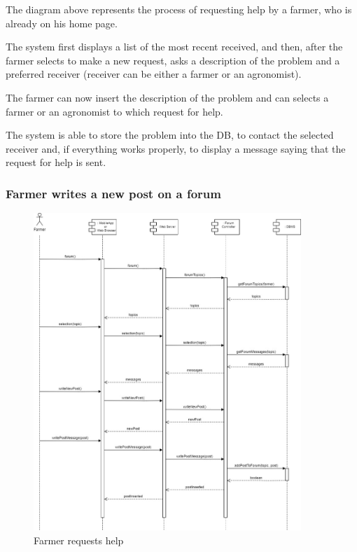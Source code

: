 \documentclass{article}
\begin{document}
        The diagram above represents the process of requesting help by a farmer, who is already on his home page. \par
        The system first displays a list of the most recent received, and then, after the farmer selects to make a new request, asks a description of the problem and a preferred receiver (receiver can be either a farmer or an agronomist). \par
        The farmer can now insert the description of the problem and can selects a farmer or an agronomist to which request for help. \par
        The system is able to store the problem into the DB, to contact the selected receiver and, if everything works properly, to display a message saying that the request for help is sent. \par
    
    
    \newpage
    
    
    \subsubsection{Farmer writes a new post on a forum}
        \begin{figure} [h]
            \centering
            \includegraphics[width=0.9\textwidth]{images/ArchitecturalDesign/RuntimeView/7. FarmerWritesNewForumPost.jpg}
            \caption{\label{fig:farmerRequestHelp}Farmer requests help}
        \end{figure}
        
\end{document}
